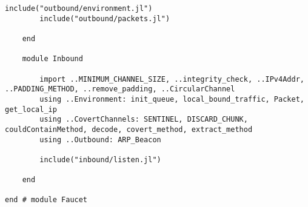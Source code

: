 \begin{lstlisting}[language=JuliaLocal, style=julia]
        include("outbound/environment.jl")
        include("outbound/packets.jl")

    end

    module Inbound

        import ..MINIMUM_CHANNEL_SIZE, ..integrity_check, ..IPv4Addr, ..PADDING_METHOD, ..remove_padding, ..CircularChannel
        using ..Environment: init_queue, local_bound_traffic, Packet, get_local_ip
        using ..CovertChannels: SENTINEL, DISCARD_CHUNK, couldContainMethod, decode, covert_method, extract_method
        using ..Outbound: ARP_Beacon

        include("inbound/listen.jl")

    end

end # module Faucet

\end{lstlisting}
